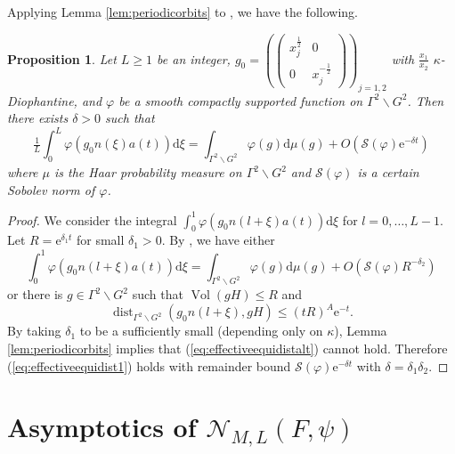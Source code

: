 \documentclass[12pt]{amsart}
\newtheorem{prop}[thm]{Proposition}
\theoremstyle{definition}
\theoremstyle{remark}
\numberwithin{equation}{section}
\newcommand{\dd}{\mathrm{d}}
\newcommand{\e}{\mathrm{e}}
\newcommand{\cN}{\mathcal{N}}
\newcommand{\cS}{\mathcal{S}}
\begin{document}
Applying Lemma \ref{lem:periodicorbits} to \cite[Theorem~1]{LMW2023a}, we have the following.
\begin{prop}
  \label{prop:effectiveequidistribution}
  Let $L\geq 1$ be an integer, $g_0 = \left(  \begin{pmatrix}  x_j^{\frac{1}{2}} & 0 \\
    0 & x_j^{-\frac{1}{2}}
  \end{pmatrix}
  \right)_{\!\! j=1,2}$ with $\tfrac{x_1}{x_2}$ $\kappa$-Diophantine, and $\varphi$ be a smooth compactly supported function on $\Gamma^2 \backslash G^2$.
  Then there exists $\delta > 0$ such that
  \begin{equation}
    \label{eq:effectiveequidistribution}
    \tfrac{1}{L} \int_0^L \varphi(g_0n(\xi) a(t)) \dd \xi = \int_{\Gamma^2 \backslash G^2} \varphi(g) \dd \mu(g) + O( \cS(\varphi) \e^{-\delta t})
  \end{equation}
  where $\mu$ is the Haar probability measure on $\Gamma^2 \backslash G^2$ and $\cS(\varphi)$ is a certain Sobolev norm of $\varphi$. 
\end{prop}

\begin{proof}
  We consider the integral $\int_{0}^1 \varphi(g_0 n(l + \xi) a(t)) \dd \xi$ for $l = 0,\dots, L-1$.
  Let $R = \e^{\delta_1 t}$ for small $\delta_1 > 0$.
  By \cite[Theorem~1]{LMW2023a}, we have either
  \begin{equation}
    \label{eq:effectiveequidist1}
    \int_{0}^1 \varphi(g_0 n(l + \xi) a(t)) \dd \xi = \int_{\Gamma^2 \backslash G^2} \varphi(g) \dd \mu (g) + O(\cS(\varphi) R^{-\delta_2})
  \end{equation}
  or there is $g \in \Gamma^2 \backslash G^2$ such that $\operatorname{Vol}(g H) \leq R$ and
  \begin{equation}
    \label{eq:effectiveequidistalt}
    \operatorname{dist}_{\Gamma^2 \backslash G^2} ( g_0n(l + \xi), gH) \leq (t R)^A \e^{-t}.
  \end{equation}
  By taking $\delta_1$ to be a sufficiently small (depending only on $\kappa$), Lemma \ref{lem:periodicorbits} implies that (\ref{eq:effectiveequidistalt}) cannot hold.
  Therefore (\ref{eq:effectiveequidist1}) holds with remainder bound $\cS(\varphi) \e^{-\delta t}$ with $\delta = \delta_1 \delta_2$. 
\end{proof}


\section{Asymptotics of $\cN_{M,L}(F,\psi) $}
\label{sec:asymptotics}
\end{document}
